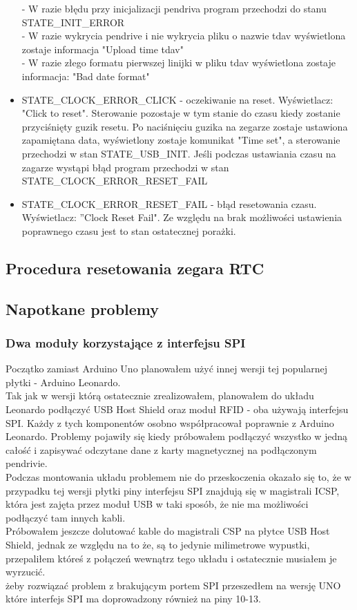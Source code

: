 \documentclass[declaration,shortabstract, mgr]{iithesis}
\begin{document}
\begin{itemize}
- W razie błędu przy inicjalizacji pendriva program przechodzi do stanu STATE\_INIT\_ERROR \\
- W razie wykrycia pendrive i nie wykrycia pliku o nazwie tdav wyświetlona zostaje informacja "Upload time tdav"\\
- W razie złego formatu pierwszej linijki w pliku tdav wyświetlona zostaje informacja: "Bad date format"
\item STATE\_CLOCK\_ERROR\_CLICK - oczekiwanie na reset. Wyświetlacz: "Click to reset". Sterowanie pozostaje w tym stanie do czasu kiedy zostanie przyciśnięty guzik resetu. Po naciśnięciu guzika na zegarze zostaje ustawiona zapamiętana data, wyświetlony zostaje komunikat "Time set", a sterowanie przechodzi w stan STATE\_USB\_INIT. Jeśli podczas ustawiania czasu na zagarze wystąpi błąd program przechodzi w stan STATE\_CLOCK\_ERROR\_RESET\_FAIL \\
\item STATE\_CLOCK\_ERROR\_RESET\_FAIL - błąd resetowania czasu. Wyświetlacz: ''Clock Reset Fail". Ze względu na brak możliwości ustawienia poprawnego czasu jest to stan ostatecznej porażki.
\end{itemize}
\subsection{Procedura resetowania zegara RTC}

\subsection{Napotkane problemy}
\subsubsection{Dwa moduły korzystające z interfejsu SPI}
\indent Początko zamiast Arduino Uno planowałem użyć innej wersji tej popularnej płytki - Arduino Leonardo. \\
\indent Tak jak w wersji którą ostatecznie zrealizowałem, planowałem do układu Leonardo podłączyć USB Host Shield oraz moduł RFID - oba używają interfejsu SPI. Każdy z tych komponentów osobno współpracował poprawnie z Arduino Leonardo. Problemy pojawiły się kiedy próbowałem podłączyć wszystko w jedną całość i zapisywać odczytane dane z karty magnetycznej na podłączonym pendrivie. \\
\indent Podczas montowania układu problemem nie do przeskoczenia okazało się to, że w przypadku tej wersji płytki piny interfejsu SPI znajdują się w magistrali ICSP, która jest zajęta przez moduł USB w taki sposób, że nie ma możliwości podłączyć tam innych kabli. \\
\indent Próbowałem jeszcze dolutować kable do magistrali CSP na płytce USB Host Shield, jednak ze względu na to że, są to jedynie milimetrowe wypustki, przepaliłem któreś z połączeń wewnątrz tego układu i ostatecznie musiałem je wyrzucić. \\
\indent żeby rozwiązać problem z brakującym portem SPI przeszedłem na wersję UNO które interfejs SPI ma doprowadzony również na piny 10-13. \\
\end{document}
